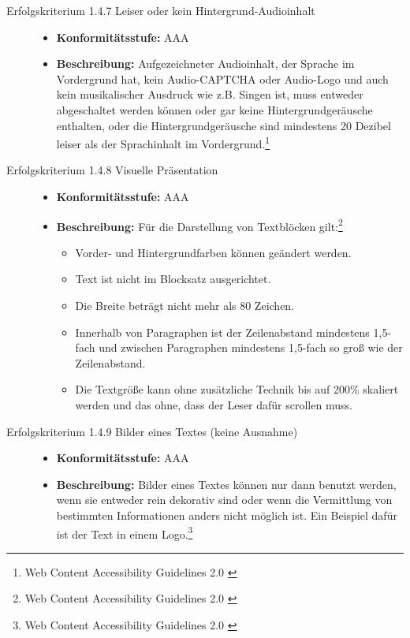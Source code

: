 \begin{description}
\begin{description}
		\item[Erfolgskriterium 1.4.7 Leiser oder kein Hintergrund-Audioinhalt]\hfill
		\begin{itemize}
			\item \textbf{Konformitätsstufe:} AAA
			\item \textbf{Beschreibung:} Aufgezeichneter Audioinhalt, der Sprache im Vordergrund hat, kein Audio-CAPTCHA oder Audio-Logo und auch kein musikalischer Ausdruck
			wie z.B. Singen ist, muss entweder abgeschaltet werden können oder gar keine Hintergrundgeräusche enthalten, oder die Hintergrundgeräusche sind mindestens 20 Dezibel 
			leiser als der Sprachinhalt im Vordergrund.\footnote{Web Content Accessibility Guidelines 2.0 \cite{WCAG2.0}}
		\end{itemize}
		
		\item[Erfolgskriterium 1.4.8 Visuelle Präsentation]\hfill
		\begin{itemize}
			\item \textbf{Konformitätsstufe:} AAA
			\item \textbf{Beschreibung:} Für die Darstellung von Textblöcken gilt:\footnote{Web Content Accessibility Guidelines 2.0 \cite{WCAG2.0}}
			\begin{itemize}
				\item Vorder- und Hintergrundfarben können geändert werden.
				\item Text ist nicht im Blocksatz ausgerichtet.
				\item Die Breite beträgt nicht mehr als 80 Zeichen.
				\item Innerhalb von Paragraphen ist der Zeilenabstand mindestens 1,5-fach und zwischen Paragraphen mindestens 1,5-fach so 
				groß wie der Zeilenabstand.
				\item Die Textgröße kann ohne zusätzliche Technik bis auf 200\% skaliert werden und das ohne, dass der Leser dafür scrollen muss.
			\end{itemize}
		\end{itemize}
		
		\item[Erfolgskriterium 1.4.9 Bilder eines Textes (keine Ausnahme)]\hfill
		\begin{itemize}
			\item \textbf{Konformitätsstufe:} AAA
			\item \textbf{Beschreibung:} Bilder eines Textes können nur dann benutzt werden, wenn sie entweder rein dekorativ sind oder wenn die Vermittlung von bestimmten 
			 Informationen anders nicht möglich ist. Ein Beispiel dafür ist der Text in einem Logo.\footnote{Web Content Accessibility Guidelines 2.0 \cite{WCAG2.0}}
		\end{itemize}
	\end{description}
	

\end{description}
